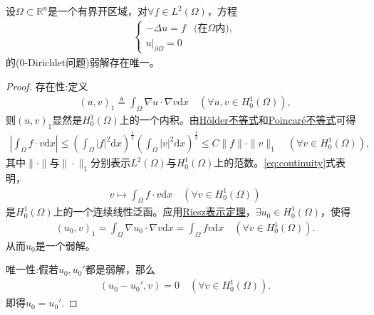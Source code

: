 \documentclass[../../main.tex]{subfiles}%
\begin{document}
\begin{theorem}
设$\Omega\subset\mathbb{R}^n$是一个有界开区域，对$\forall f\in L^2(\Omega)$，方程
\begin{align*}
\begin{cases}
-\Delta u=f & \text{(在$\Omega$内)}, \\
u|_{\partial\Omega}=0
\end{cases}
\end{align*}
的(0-Dirichlet问题)弱解存在唯一。
\end{theorem}
\begin{proof}

{\heiti 存在性:}定义
\begin{align*}
(u,v)_1\triangleq\int_\Omega \nabla u\cdot\nabla v\mathrm{d}x\quad (\forall u,v\in H_0^1(\Omega)),
\end{align*}
则$(u,v)_1$显然是$H_0^1(\Omega)$上的一个内积。由\hyperref[Real-Analysis-theorem:实变函数--Hölder不等式]{Hölder不等式}和\hyperref[lemma:(庞加莱)Poincaré不等式]{Poincaré不等式}可得
\begin{align}
\left|\int_\Omega f\cdot v\mathrm{d}x\right|\leqslant\left(\int_\Omega |f|^2\mathrm{d}x\right)^{\frac{1}{2}}\left(\int_\Omega |v|^2\mathrm{d}x\right)^{\frac{1}{2}}
\leqslant C\|f\|\cdot\|v\|_1\quad (\forall v\in H_0^1(\Omega)),
\label{eq:continuity}
\end{align}
其中$\|\cdot\|$与$\|\cdot\|_1$分别表示$L^2(\Omega)$与$H_0^1(\Omega)$上的范数。\eqref{eq:continuity}式表明，
\begin{align*}
v\mapsto\int_\Omega f\cdot v\mathrm{d}x\quad (\forall v\in H_0^1(\Omega))
\end{align*}
是$H_0^1(\Omega)$上的一个连续线性泛函。应用\hyperref[theorem:Riesz表示定理(Hilbert空间)]{Riesz表示定理}，$\exists u_0\in H_0^1(\Omega)$，使得
\begin{align*}
(u_0,v)_1=\int_\Omega \nabla u_0\cdot\nabla v\mathrm{d}x=\int_\Omega fv\mathrm{d}x\quad (\forall v\in H_0^1(\Omega)).
\end{align*}
从而$u_0$是一个弱解。

{\heiti 唯一性:}假若$u_0,u_0'$都是弱解，那么
\begin{align*}
(u_0-u_0',v)=0\quad (\forall v\in H_0^1(\Omega)).
\end{align*}
即得$u_0=u_0'$.

\end{proof}
\end{document}
